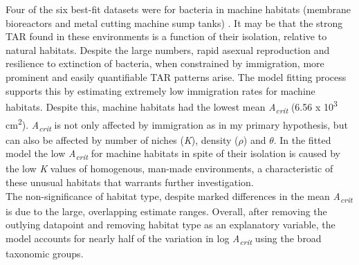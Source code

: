 Four of the six best-fit datasets were for bacteria in machine habitats (membrane bioreactors and metal cutting machine sump tanks) \cite{van2006bacterial} \cite{van2005island}. It may be that the strong TAR found in these environments is a function of their isolation, relative to natural habitats. Despite the large numbers, rapid asexual reproduction and resilience to extinction of bacteria, when constrained by immigration, more prominent and easily quantifiable TAR patterns arise. The model fitting process supports this by estimating extremely low immigration rates for machine habitats. Despite this, machine habitats had the lowest mean \textit{A\textsubscript{crit}} (6.56 x 10\textsuperscript{3} cm\textsuperscript{2}). \textit{A\textsubscript{crit}} is not only affected by immigration as in my primary hypothesis, but can also be affected by number of niches (\textit{K}), density ($\rho$) and $\theta$. In the fitted model the low \textit{A\textsubscript{crit}} for machine habitats in spite of their isolation is caused by the low \textit{K} values of homogenous, man-made environments, a characteristic of these unusual habitats that warrants further investigation. \\
\noindent The non-significance of habitat type, despite marked differences in the mean \textit{A\textsubscript{crit}} is due to the large, overlapping estimate ranges. Overall, after removing the outlying datapoint and removing habitat type as an explanatory variable, the model accounts for nearly half of the variation in log \textit{A\textsubscript{crit}} using the broad taxonomic groups.\\




